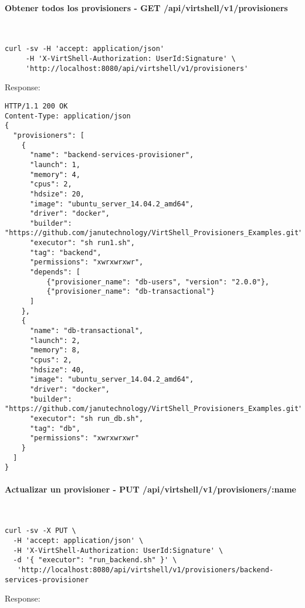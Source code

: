 \paragraph{Obtener todos los provisioners - GET /api/virtshell/v1/provisioners} ~\\

\begin{lstlisting}[style=json]
curl -sv -H 'accept: application/json' 
     -H 'X-VirtShell-Authorization: UserId:Signature' \ 
     'http://localhost:8080/api/virtshell/v1/provisioners'
\end{lstlisting}

Response:

\begin{lstlisting}[style=json]
HTTP/1.1 200 OK
Content-Type: application/json
{
  "provisioners": [
    {
      "name": "backend-services-provisioner",
      "launch": 1,
      "memory": 4,
      "cpus": 2,
      "hdsize": 20,
      "image": "ubuntu_server_14.04.2_amd64",
      "driver": "docker",
      "builder": "https://github.com/janutechnology/VirtShell_Provisioners_Examples.git",
      "executor": "sh run1.sh",
      "tag": "backend",
      "permissions": "xwrxwrxwr",
      "depends": [
          {"provisioner_name": "db-users", "version": "2.0.0"},
          {"provisioner_name": "db-transactional"}
      ]
    },
    {
      "name": "db-transactional",
      "launch": 2,
      "memory": 8,
      "cpus": 2,
      "hdsize": 40,
      "image": "ubuntu_server_14.04.2_amd64",
      "driver": "docker",
      "builder": "https://github.com/janutechnology/VirtShell_Provisioners_Examples.git",
      "executor": "sh run_db.sh",
      "tag": "db",
      "permissions": "xwrxwrxwr"
    }
  ]
}
\end{lstlisting}

\paragraph{Actualizar un provisioner - PUT /api/virtshell/v1/provisioners/:name} ~\\

\begin{lstlisting}[style=json]
curl -sv -X PUT \
  -H 'accept: application/json' \
  -H 'X-VirtShell-Authorization: UserId:Signature' \
  -d '{ "executor": "run_backend.sh" }' \
   'http://localhost:8080/api/virtshell/v1/provisioners/backend-services-provisioner
\end{lstlisting}

Response:

